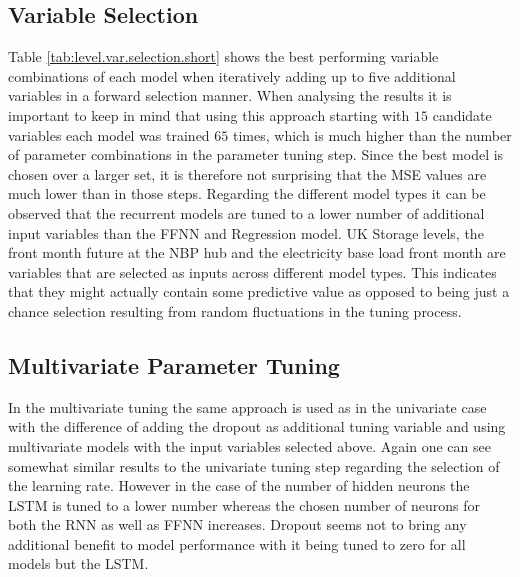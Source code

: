 \subsection{Variable Selection}
Table \ref{tab:level.var.selection.short} shows the best performing variable combinations of each model when iteratively adding up to five additional variables in a forward selection manner. When analysing the results it is important to keep in mind that using this approach starting with $15$ candidate variables each model was trained $65$ times, which is much higher than the number of parameter combinations in the parameter tuning step. Since the best model is chosen over a larger set, it is therefore not surprising that the MSE values are much lower than in those steps. Regarding the different model types it can be observed that the recurrent models are tuned to a lower number of additional input variables than the FFNN and Regression model. UK Storage levels, the front month future at the NBP hub and the electricity base load front month are variables that are selected as inputs across different model types. This indicates that they might actually contain some predictive value as opposed to being just a chance selection resulting from random fluctuations in the tuning process.

\subsection{Multivariate Parameter Tuning}
In the multivariate tuning the same approach is used as in the univariate case with the difference of adding the dropout as additional tuning variable and using multivariate models with the input variables selected above. Again one can see somewhat similar results to the univariate tuning step regarding the selection of the  learning rate. However in the case of the number of hidden neurons the LSTM is tuned to a lower number whereas the chosen number of neurons for both the RNN as well as FFNN increases. Dropout seems not to bring any additional benefit to model performance with it being tuned to zero for all models but the LSTM.

